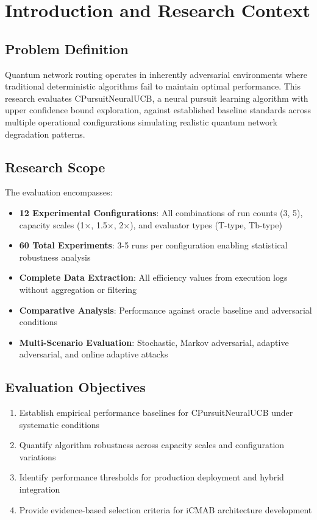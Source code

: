\documentclass[12pt,a4paper]{article}
\begin{document}
\section{Introduction and Research Context}

\subsection{Problem Definition}

Quantum network routing operates in inherently adversarial environments where traditional deterministic algorithms fail to maintain optimal performance. This research evaluates CPursuitNeuralUCB, a neural pursuit learning algorithm with upper confidence bound exploration, against established baseline standards across multiple operational configurations simulating realistic quantum network degradation patterns.

\subsection{Research Scope}

The evaluation encompasses:

\begin{itemize}
\item \textbf{12 Experimental Configurations}: All combinations of run counts (3, 5), capacity scales (1×, 1.5×, 2×), and evaluator types (T-type, Tb-type)
\item \textbf{60 Total Experiments}: 3-5 runs per configuration enabling statistical robustness analysis
\item \textbf{Complete Data Extraction}: All efficiency values from execution logs without aggregation or filtering
\item \textbf{Comparative Analysis}: Performance against oracle baseline and adversarial conditions
\item \textbf{Multi-Scenario Evaluation}: Stochastic, Markov adversarial, adaptive adversarial, and online adaptive attacks
\end{itemize}

\subsection{Evaluation Objectives}

\begin{enumerate}
\item Establish empirical performance baselines for CPursuitNeuralUCB under systematic conditions
\item Quantify algorithm robustness across capacity scales and configuration variations
\item Identify performance thresholds for production deployment and hybrid integration
\item Provide evidence-based selection criteria for iCMAB architecture development
\end{enumerate}
\end{document}
